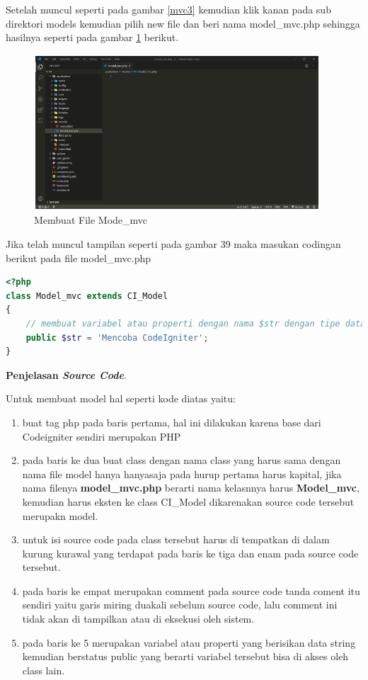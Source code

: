 Setelah muncul seperti pada gambar \ref{mvc3} kemudian  klik kanan pada sub direktori models kemudian pilih new file dan beri nama model\_mvc.php sehingga hasilnya seperti pada gambar \ref{mvc4} berikut.
\begin{figure}[h]
	\centerline{\includegraphics[width=0.95\textwidth]{figures/MVC/4.png}}
	\caption{Membuat File Mode\_mvc}
	\label{mvc4}
\end{figure}

Jika telah muncul tampilan seperti pada gambar 39 maka masukan codingan berikut pada file model\_mvc.php

\begin{lstlisting}[language=PHP]
<?php
class Model_mvc extends CI_Model
{
    // membuat variabel atau properti dengan nama $str dengan tipe data string
    public $str = 'Mencoba CodeIgniter';
}

\end{lstlisting} 
\textbf{Penjelasan \textit{Source Code}}.\par
	Untuk membuat model hal seperti kode diatas yaitu:
\begin{enumerate}
\item buat tag php pada baris pertama, hal ini dilakukan karena base dari Codeigniter sendiri merupakan PHP
\item pada baris ke dua buat class dengan nama class yang harus sama dengan nama file model hanya hanyasaja pada hurup pertama harus kapital, jika nama filenya \textbf{model\_mvc.php} berarti nama kelasnnya harus \textbf{Model\_mvc}, kemudian harus eksten ke class CI\_Model dikarenakan source code tersebut merupakn model.
\item untuk isi source code pada class tersebut harus di tempatkan di dalam kurung kurawal yang terdapat pada baris ke tiga dan enam pada source code tersebut.
\item pada baris ke empat merupakan comment pada source code tanda coment itu sendiri yaitu garis miring duakali sebelum source code, lalu comment ini tidak akan di tampilkan atau di eksekusi oleh sistem.
\item pada baris ke 5 merupakan variabel atau properti yang berisikan data string kemudian berstatus public yang berarti variabel tersebut bisa di akses oleh class lain.
\end{enumerate}

